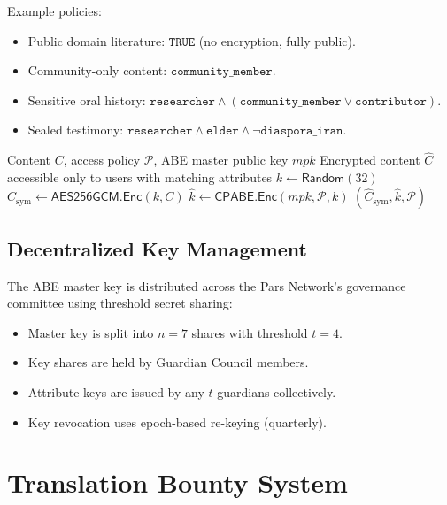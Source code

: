 \documentclass[11pt,a4paper]{article}
\begin{document}
Example policies:
\begin{itemize}
    \item Public domain literature: $\texttt{TRUE}$ (no encryption, fully public).
    \item Community-only content: $\texttt{community\_member}$.
    \item Sensitive oral history: $\texttt{researcher} \wedge (\texttt{community\_member} \vee \texttt{contributor})$.
    \item Sealed testimony: $\texttt{researcher} \wedge \texttt{elder} \wedge \neg\texttt{diaspora\_iran}$.
\end{itemize}

\begin{algorithm}[H]
\caption{CP-ABE Encryption for Archive Object}
\label{alg:cpabe}
\begin{algorithmic}[1]
\Require Content $C$, access policy $\mathcal{P}$, ABE master public key $\mathit{mpk}$
\Ensure Encrypted content $\hat{C}$ accessible only to users with matching attributes
\State $k \leftarrow \mathsf{Random}(32)$ 
\State $\hat{C}_{\text{sym}} \leftarrow \mathsf{AES256GCM}.\mathsf{Enc}(k, C)$ 
\State $\hat{k} \leftarrow \mathsf{CPABE}.\mathsf{Enc}(\mathit{mpk}, \mathcal{P}, k)$ 
\State \Return $(\hat{C}_{\text{sym}}, \hat{k}, \mathcal{P})$
\end{algorithmic}
\end{algorithm}

\subsection{Decentralized Key Management}

The ABE master key is distributed across the Pars Network's governance committee using threshold secret sharing:

\begin{itemize}
    \item Master key is split into $n = 7$ shares with threshold $t = 4$.
    \item Key shares are held by Guardian Council members.
    \item Attribute keys are issued by any $t$ guardians collectively.
    \item Key revocation uses epoch-based re-keying (quarterly).
\end{itemize}

\section{Translation Bounty System}
\end{document}
